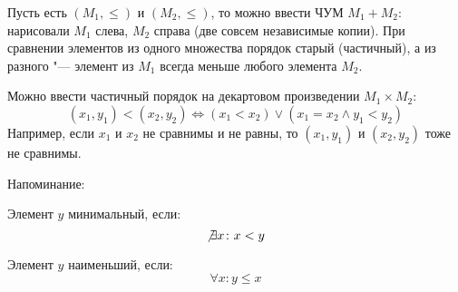 \begin{Def}
	Пусть есть $(M_1, \le)$ и $(M_2, \le)$, то можно ввести ЧУМ $M_1+M_2$:
	нарисовали $M_1$ слева, $M_2$ справа (две совсем независимые копии).
	При сравнении элементов из одного множества
	порядок старый (частичный), а из разного "--- элемент из $M_1$ всегда меньше любого элемента $M_2$.
\end{Def}
\begin{Def}
	Можно ввести частичный порядок на декартовом произведении $M_1 \times M_2$:
	\[
		(x_1, y_1) < (x_2, y_2)
		\iff
		(x_1 < x_2) \lor (x_1 = x_2 \land y_1 < y_2)
	\]
	Например, если $x_1$ и $x_2$ не сравнимы и не равны, то $(x_1, y_1)$ и $(x_2, y_2)$ тоже не сравнимы.
\end{Def}

Напоминание:
\begin{Def}
	Элемент $y$ минимальный, если:
	\[ \not\exists x \colon x < y \]
\end{Def}
\begin{Def}
	Элемент $y$ наименьший, если:
	\[ \forall x \colon y \le x \]
\end{Def}

